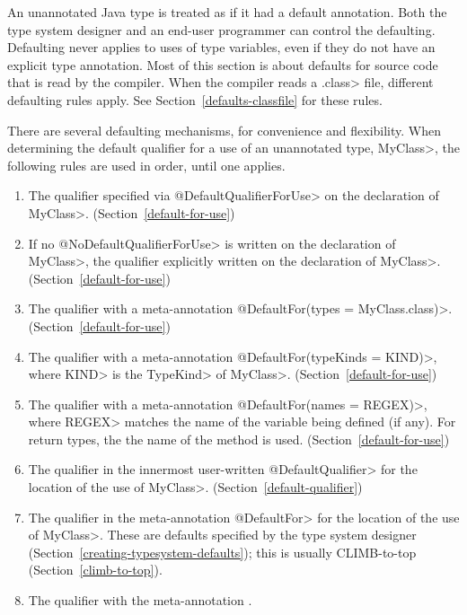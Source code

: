 

An unannotated
Java type is treated as if it had a default annotation.
Both the type system designer and an end-user programmer can control the defaulting.
Defaulting never applies to uses of type variables, even if they do not
have an explicit type annotation.
Most of this section is about defaults for source code that is read by
the compiler.  When the compiler reads a \<.class> file, different
defaulting rules apply.
See Section~\ref{defaults-classfile} for these rules.

There are several defaulting mechanisms, for convenience and flexibility.
When determining the default qualifier for a use of an unannotated type, \<MyClass>, the following
rules are used in order, until one applies.

\begin{enumerate}
\item
  The qualifier specified via \<@DefaultQualifierForUse> on the declaration of \<MyClass>.
  (Section~\ref{default-for-use})
\item
  If no \<@NoDefaultQualifierForUse> is written on the declaration of \<MyClass>, the qualifier
  explicitly written on the declaration of \<MyClass>. (Section~\ref{default-for-use})
\item
  The qualifier with a meta-annotation \<@DefaultFor(types = MyClass.class)>. (Section~\ref{default-for-use})
\item
  The qualifier with a meta-annotation \<@DefaultFor(typeKinds = KIND)>, where \<KIND> is the
  \<TypeKind> of \<MyClass>. (Section~\ref{default-for-use})
\item
  The qualifier with a meta-annotation \<@DefaultFor(names = REGEX)>, where \<REGEX>
  matches the name of the variable being defined (if any).  For return types, the  the name of
  the method is used. (Section~\ref{default-for-use})
\item
  The qualifier in the innermost user-written \<@DefaultQualifier> for the location of the use of \<MyClass>.
  (Section~\ref{default-qualifier})
\item
  The qualifier in the meta-annotation \<@DefaultFor> for the location of the use of \<MyClass>.
  These are defaults specified by the type system designer (Section~\ref{creating-typesystem-defaults});
  this is usually CLIMB-to-top (Section~\ref{climb-to-top}).
\item
  The qualifier with the meta-annotation .
\end{enumerate}

